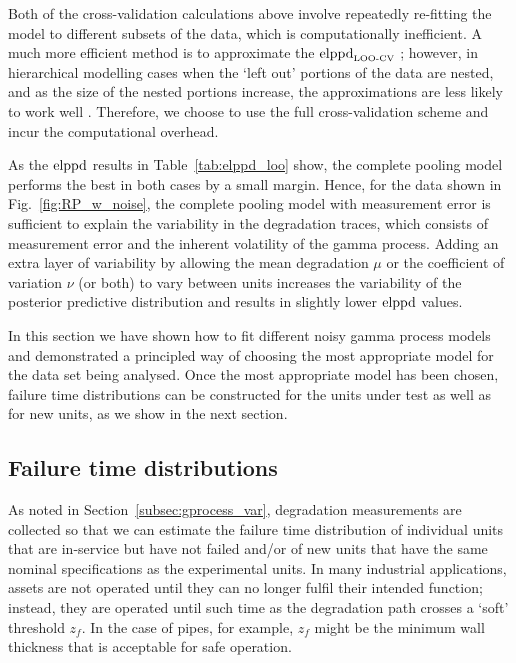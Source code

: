 \documentclass{article}
\begin{document}


Both of the cross-validation calculations above involve repeatedly re-fitting the model to different subsets of the data, which is computationally inefficient. A much more efficient method is to approximate the $\hbox{elppd}_{\hbox{\tiny{LOO-CV}}}$ \citep{Vehtari2017}; however, in hierarchical modelling cases when the `left out' portions of the data are nested, and as the size of the nested portions increase, the approximations are less likely to work well \citep{Vehtari2017}. Therefore, we choose to use the full cross-validation scheme and incur the computational overhead.

As the $\hbox{elppd}$ results in Table~\ref{tab:elppd_loo} show, the complete pooling model performs the best in both cases by a small margin. Hence, for the data shown in Fig.~\ref{fig:RP_w_noise}, the complete pooling model with measurement error is sufficient to explain the variability in the degradation traces, which consists of measurement error and the inherent volatility of the gamma process. Adding an extra layer of variability by allowing the mean degradation $\mu$ or the coefficient of variation $\nu$ (or both) to vary between units increases the variability of the posterior predictive distribution and results in slightly lower $\hbox{elppd}$ values.  

In this section we have shown how to fit different noisy gamma process models and demonstrated a principled way of choosing the most appropriate model for the data set being analysed. Once the most appropriate model has been chosen, failure time distributions can be constructed for the units under test as well as for new units, as we show in the next section.

\subsection{Failure time distributions}
\label{subsec:ftdist}

As noted in Section~\ref{subsec:gprocess_var}, degradation measurements are collected so that we can estimate the failure time distribution of individual units that are in-service but have not failed and/or of new units that have the same nominal specifications as the experimental units. In many industrial applications, assets are not operated until they can no longer fulfil their intended function; instead, they are operated until such time as the degradation path crosses a `soft' threshold $z_f$. In the case of pipes, for example, $z_f$ might be the minimum wall thickness that is acceptable for safe operation. 
\end{document}
